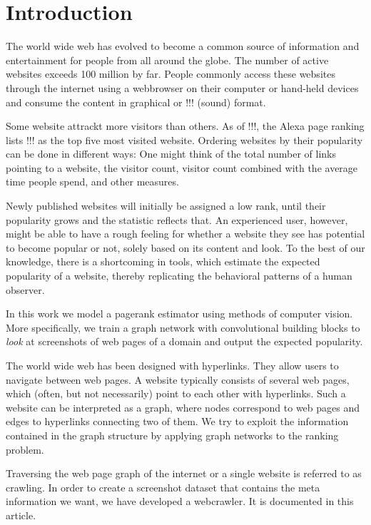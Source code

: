 \section{Introduction}

The world wide web has evolved to become a common source of information and entertainment for people from all around the globe. The number of active websites exceeds 100 million by far. People commonly access these websites through the internet using a webbrowser on their computer or hand-held devices and consume the content in graphical or !!! (sound) format.

Some website attrackt more visitors than others. As of !!!, the Alexa page ranking lists !!! as the top five most visited website. Ordering websites by their popularity can be done in different ways: One might think of the total number of links pointing to a website, the visitor count, visitor count combined with the average time people spend, and other measures.

Newly published websites will initially be assigned a low rank, until their popularity grows and the statistic reflects that. An experienced user, however, might be able to have a rough feeling for whether a website they see has potential to become popular or not, solely based on its content and look. To the best of our knowledge, there is a shortcoming in tools, which estimate the expected popularity of a website, thereby replicating the behavioral patterns of a human observer.

In this work we model a pagerank estimator using methods of computer vision. More specifically, we train a graph network with convolutional building blocks to \textit{look} at screenshots of web pages of a domain and output the expected popularity.

The world wide web has been designed with hyperlinks. They allow users to navigate between web pages. A website typically consists of several web pages, which (often, but not necessarily) point to each other with hyperlinks. Such a website can be interpreted as a graph, where nodes correspond to web pages and edges to hyperlinks connecting two of them. We try to exploit the information contained in the graph structure by applying graph networks to the ranking problem.

Traversing the web page graph of the internet or a single website is referred to as crawling. In order to create a screenshot dataset that contains the meta information we want, we have developed a webcrawler. It is documented in this article.

